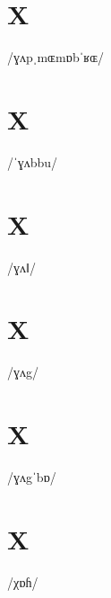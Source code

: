 \documentclass[10pt,a4paper,twoside]{book}
\begin{document}
\section*{X}

\begin{multicols}{3}
 {/ɣʌpˌmɶmɒbˈʁɶ/} {}
\end{multicols}

\section*{X}

\begin{multicols}{3}
 {/ˈɣʌbbu/} {}
\end{multicols}

\section*{X}

\begin{multicols}{3}
 {/ɣʌǁ/} {}
\end{multicols}

\section*{X}

\begin{multicols}{3}
 {/ɣʌg/} {}
\end{multicols}

\section*{X}

\begin{multicols}{3}
 {/ɣʌgˈbɒ/} {}
\end{multicols}

\section*{X}

\begin{multicols}{3}
 {/χɒɦ/} {}
\end{multicols}
\end{document}
